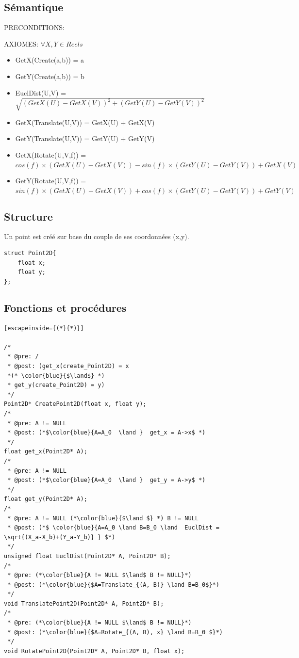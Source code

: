 \documentclass[a4paper, 11pt, oneside]{article}
\begin{document}
\subsection{Sémantique}
\noindent PRECONDITIONS:

\noindent AXIOMES: 
$\forall X,Y \in Reels$
\begin{itemize}
    \item GetX(Create(a,b)) = a
    \item GetY(Create(a,b)) = b
    \item EuclDist(U,V) = $\sqrt{{(GetX(U)-GetX(V))}^{2}+{(GetY(U)-GetY(V))}^{2}}$
    \item GetX(Translate(U,V)) = GetX(U) + GetX(V)
    \item GetY(Translate(U,V)) = GetY(U) + GetY(V)
    \item GetX(Rotate(U,V,f)) = $cos(f) \times (GetX(U)-GetX(V)) - sin(f) \times (GetY(U)-GetY(V)) + GetX(V) $ 
    \item GetY(Rotate(U,V,f)) = $sin(f) \times (GetX(U)-GetX(V)) + cos(f) \times (GetY(U)-GetY(V)) + GetY(V) $ 
    
    
    
\end{itemize}

\subsection{Structure}
Un point est créé sur base du couple de ses coordonnées (x,y). 

\begin{lstlisting}
struct Point2D{
	float x;
	float y;
};
\end{lstlisting}

\subsection{Fonctions et procédures}

\begin{lstlisting}[escapeinside={(*}{*)}]

/* 
 * @pre: /
 * @post: (get_x(create_Point2D) = x 
 *(* \color{blue}{$\land$} *)
 * get_y(create_Point2D) = y) 
 */
Point2D* CreatePoint2D(float x, float y);
/* 
 * @pre: A != NULL
 * @post: (*$\color{blue}{A=A_0  \land }  get_x = A->x$ *)
 */
float get_x(Point2D* A);
/* 
 * @pre: A != NULL
 * @post: (*$\color{blue}{A=A_0  \land }  get_y = A->y$ *)
 */
float get_y(Point2D* A);
/* 
 * @pre: A != NULL (*\color{blue}{$\land $} *) B != NULL
 * @post: (*$ \color{blue}{A=A_0 \land B=B_0 \land  EuclDist = \sqrt{(X_a-X_b)+(Y_a-Y_b)} } $*)
 */
unsigned float EuclDist(Point2D* A, Point2D* B);
/* 
 * @pre: (*\color{blue}{A != NULL $\land$ B != NULL}*)
 * @post: (*\color{blue}{$A=Translate_{(A, B)} \land B=B_0$}*)
 */
void TranslatePoint2D(Point2D* A, Point2D* B);
/* 
 * @pre: (*\color{blue}{A != NULL $\land$ B != NULL}*)
 * @post: (*\color{blue}{$A=Rotate_{(A, B), x} \land B=B_0 $}*)
 */
void RotatePoint2D(Point2D* A, Point2D* B, float x);
\end{lstlisting}
\end{document}
